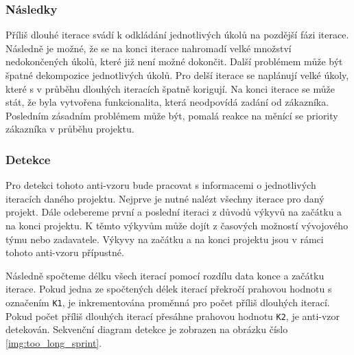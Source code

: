 \documentclass[czech,DP]{thesiskiv}
\begin{document}
\subsubsection{Následky}
Příliš dlouhé iterace svádí k odkládání jednotlivých úkolů na pozdější fázi iterace. Následně je možné, že se na konci iterace nahromadí velké množství nedokončených úkolů, které již není možné dokončit. Další problémem může být špatné dekompozice jednotlivých úkolů. Pro delší iterace se naplánují velké úkoly, které s v průběhu dlouhých iteracích špatně korigují. Na konci iterace se může stát, že byla vytvořena funkcionalita, která neodpovídá zadání od zákazníka. Posledním zásadním problémem může být, pomalá reakce na měnící se priority zákazníka v průběhu projektu. \cite{scrum_but_anti_patterns}
\subsubsection{Detekce}
Pro detekci tohoto anti-vzoru bude pracovat s informacemi o jednotlivých iteracích daného projektu. Nejprve je nutné nalézt všechny iterace pro daný projekt. Dále odebereme první a poslední iteraci z důvodů výkyvů na začátku a na konci projektu. K těmto výkyvům může dojít z časových možností vývojového týmu nebo zadavatele. Výkyvy na začátku a na konci projektu jsou v rámci tohoto anti-vzoru přípustné.
\par
Následně spočteme délku všech iterací pomocí rozdílu data konce a začátku iterace. Pokud jedna ze spočtených délek iterací překročí prahovou hodnotu s označením \texttt{K1}, je inkrementována proměnná pro počet příliš dlouhých iterací. Pokud počet příliš dlouhých iterací přesáhne prahovou hodnotu \texttt{K2}, je anti-vzor detekován. Sekvenční diagram detekce je zobrazen na obrázku číslo \ref{img:too_long_sprint}.
\end{document}
